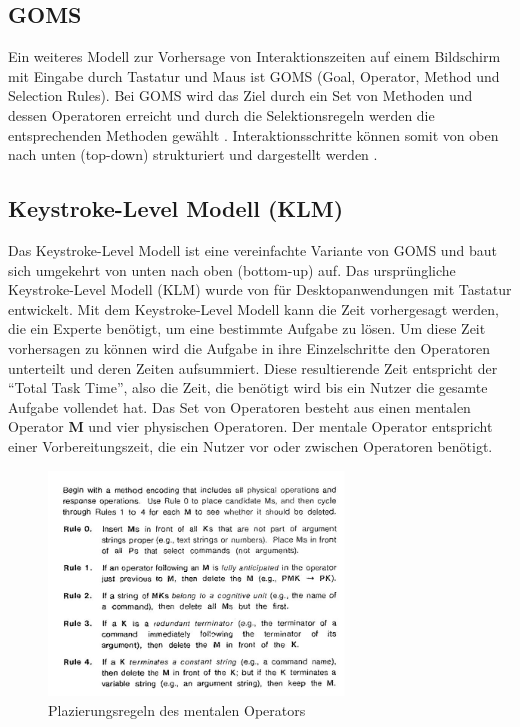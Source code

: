 \subsection[GOMS]{GOMS}
Ein weiteres Modell zur Vorhersage von Interaktionszeiten auf einem Bildschirm mit Eingabe durch Tastatur und Maus ist GOMS (Goal, Operator, Method und Selection Rules). 
Bei GOMS wird das Ziel durch ein Set von Methoden und dessen Operatoren erreicht und durch die Selektionsregeln werden die entsprechenden Methoden gewählt \citep{card1983psychology}.
Interaktionsschritte können somit von oben nach unten (top-down) strukturiert und dargestellt werden \citep{butz2014mensch}. 

\subsection{Keystroke-Level Modell (KLM)}
Das Keystroke-Level Modell ist eine vereinfachte Variante von GOMS und baut sich umgekehrt von unten nach oben (bottom-up) auf. 
Das ursprüngliche Keystroke-Level Modell (KLM) wurde von \citet{Card_1980} für Desktopanwendungen mit Tastatur entwickelt. 
Mit dem Keystroke-Level Modell kann die Zeit vorhergesagt werden, die ein Experte benötigt, um eine bestimmte Aufgabe zu lösen. 
Um diese Zeit vorhersagen zu können wird die Aufgabe in ihre Einzelschritte den Operatoren unterteilt und deren Zeiten aufsummiert. 
Diese resultierende Zeit entspricht der "`Total Task Time"', also die Zeit, die benötigt wird bis ein Nutzer die gesamte Aufgabe vollendet hat. 
Das Set von Operatoren besteht aus einen mentalen Operator \textbf{M} und vier physischen Operatoren. 
Der mentale Operator entspricht einer Vorbereitungszeit, die ein Nutzer vor oder zwischen Operatoren benötigt.
\begin{figure}
	\centering
		\includegraphics[width=0.7\textwidth]{img/KLM_Mental_Operator_Rules.JPG}
	\caption{Plazierungsregeln des mentalen Operators}
	\label{fig:KLM_OPeratoren}
\end{figure}
